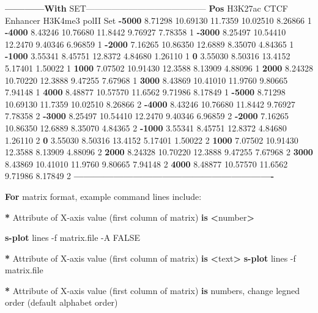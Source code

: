 \documentclass[]{article}
\newenvironment{Shaded}{\begin{snugshade}}{\end{snugshade}}
\newcommand{\KeywordTok}[1]{\textcolor[rgb]{0.13,0.29,0.53}{\textbf{{#1}}}}
\newcommand{\NormalTok}[1]{{#1}}
\numberwithin{figure}{section}
\numberwithin{table}{section}
\theoremstyle{definition}
\theoremstyle{definition}
\theoremstyle{definition}
\theoremstyle{remark}
\begin{document}
\begin{Shaded}
\begin{Highlighting}[]
\KeywordTok{------------With} \NormalTok{SET------------------------------------------}
\KeywordTok{Pos} \NormalTok{H3K27ac CTCF    Enhancer    H3K4me3 polII   Set}
\KeywordTok{-5000}   \NormalTok{8.71298 10.69130    11.7359 10.02510    8.26866 1}
\KeywordTok{-4000}   \NormalTok{8.43246 10.76680    11.8442 9.76927 7.78358 1}
\KeywordTok{-3000}   \NormalTok{8.25497 10.54410    12.2470 9.40346 6.96859 1}
\KeywordTok{-2000}   \NormalTok{7.16265 10.86350    12.6889 8.35070 4.84365 1}
\KeywordTok{-1000}   \NormalTok{3.55341 8.45751 12.8372 4.84680 1.26110 1}
\KeywordTok{0}   \NormalTok{3.55030 8.50316 13.4152 5.17401 1.50022 1}
\KeywordTok{1000}    \NormalTok{7.07502 10.91430    12.3588 8.13909 4.88096 1}
\KeywordTok{2000}    \NormalTok{8.24328 10.70220    12.3888 9.47255 7.67968 1}
\KeywordTok{3000}    \NormalTok{8.43869 10.41010    11.9760 9.80665 7.94148 1}
\KeywordTok{4000}    \NormalTok{8.48877 10.57570    11.6562 9.71986 8.17849 1}
\KeywordTok{-5000}   \NormalTok{8.71298 10.69130    11.7359 10.02510    8.26866 2}
\KeywordTok{-4000}   \NormalTok{8.43246 10.76680    11.8442 9.76927 7.78358 2}
\KeywordTok{-3000}   \NormalTok{8.25497 10.54410    12.2470 9.40346 6.96859 2}
\KeywordTok{-2000}   \NormalTok{7.16265 10.86350    12.6889 8.35070 4.84365 2}
\KeywordTok{-1000}   \NormalTok{3.55341 8.45751 12.8372 4.84680 1.26110 2}
\KeywordTok{0}   \NormalTok{3.55030 8.50316 13.4152 5.17401 1.50022 2}
\KeywordTok{1000}    \NormalTok{7.07502 10.91430    12.3588 8.13909 4.88096 2}
\KeywordTok{2000}    \NormalTok{8.24328 10.70220    12.3888 9.47255 7.67968 2}
\KeywordTok{3000}    \NormalTok{8.43869 10.41010    11.9760 9.80665 7.94148 2}
\KeywordTok{4000}    \NormalTok{8.48877 10.57570    11.6562 9.71986 8.17849 2}
\KeywordTok{-------------------------------------------------------------}

\KeywordTok{For} \NormalTok{matrix format, example command lines include:}

\KeywordTok{*} \NormalTok{Attribute of X-axis value (first column of matrix) }\KeywordTok{is} \KeywordTok{<}\NormalTok{number}\KeywordTok{>}

    \KeywordTok{s-plot} \NormalTok{lines -f matrix.file -A FALSE}

\KeywordTok{*} \NormalTok{Attribute of X-axis value (first column of matrix) }\KeywordTok{is} \KeywordTok{<}\NormalTok{text}\KeywordTok{>}
    \KeywordTok{s-plot} \NormalTok{lines -f matrix.file }

\KeywordTok{*} \NormalTok{Attribute of X-axis value (first column of matrix) }\KeywordTok{is} \NormalTok{numbers, change legned order (default alphabet order)}


\end{Highlighting}
\end{Shaded}
\end{document}
